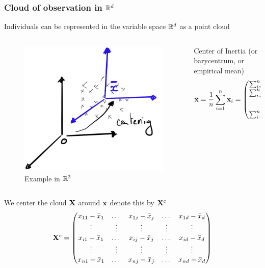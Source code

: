 \documentclass{beamer}\usepackage[]{graphicx}\usepackage[]{color}
\begin{document}
\begin{frame}
  \frametitle{Cloud of observation in $\mathbb{R}^d$}

  Individuals can be represented in the \alert{variable space $\mathbb{R}^d$} as a point cloud

  \begin{columns}
    \begin{column}{.5\textwidth}
      \begin{figure}      
      \includegraphics[width=.6\textwidth]{cloud_centering}
      \vspace{-.25cm}
      \caption{Example in $\mathbb{R}^3$}
      \end{figure}      
    \end{column}

  \begin{column}{.5\textwidth}
    \begin{block}{Center of Inertia}
      (or barycentrum, or empirical mean)
      \[ \bar{\mathbf{x}} = \frac{1}{n} \sum _{i=1}^n \mathbf{x}_i = 
      \begin{pmatrix}
        \sum _{i=1}^n x_{i1}/n \\
        \sum _{i=1}^n x_{i2}/n \\
        \vdots\\
        \sum _{i=1}^n x_{id} /n
      \end{pmatrix}
      \]
    \end{block}
  \end{column}
  \end{columns}

  We center the cloud $\mathbf{X}$ around $\mathbf{x}$ denote this by $\mathbf{X}^c$
  \begin{equation*}
    \mathbf{X}^c = \begin{pmatrix}
    x_{11} - \bar{x}_1 &   \dots & x_{1j}  - \bar{x}_j & \dots  & x_{1d} - \bar{x}_d   \cr
              \vdots   &  \vdots & \vdots              & \vdots & \vdots  \cr
    x_{i1} - \bar{x}_1 &   \dots & x_{ij} - \bar{x}_j  & \dots  & x_{id}  - \bar{x}_d \cr
              \vdots   &  \vdots & \vdots              & \vdots & \vdots  \cr
    x_{n1} - \bar{x}_1 &  \dots  & x_{nj} - \bar{x}_j  & \dots  & x_{nd}  - \bar{x}_d \cr
    \end{pmatrix}
  \end{equation*}

\end{frame}
\end{document}

